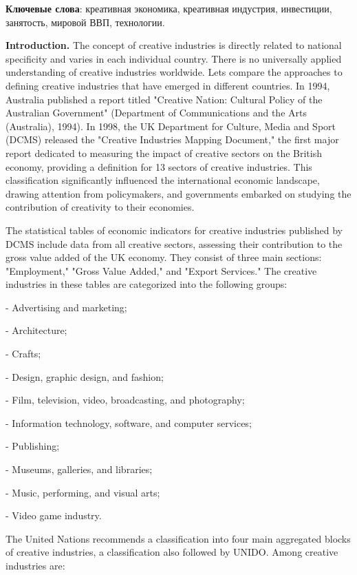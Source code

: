 {\bfseries Ключевые слова}: креативная экономика, креативная индустрия,
инвестиции, занятость, мировой ВВП, технологии.

\begin{multicols}{2}
{\bfseries Introduction.} The concept of creative industries is directly
related to national specificity and varies in each individual country.
There is no universally applied understanding of creative industries
worldwide. Let\textquotesingle s compare the approaches to defining
creative industries that have emerged in different countries. In 1994,
Australia published a report titled "Creative Nation: Cultural Policy of
the Australian Government" (Department of Communications and the Arts
(Australia), 1994). In 1998, the UK Department for Culture, Media and
Sport (DCMS) released the "Creative Industries Mapping Document," the
first major report dedicated to measuring the impact of creative sectors
on the British economy, providing a definition for 13 sectors of
creative industries. This classification significantly influenced the
international economic landscape, drawing attention from policymakers,
and governments embarked on studying the contribution of creativity to
their economies.

The statistical tables of economic indicators for creative industries
published by DCMS include data from all creative sectors, assessing
their contribution to the gross value added of the UK economy. They
consist of three main sections: "Employment," "Gross Value Added," and
"Export Services." The creative industries in these tables are
categorized into the following groups:

- Advertising and marketing;

- Architecture;

- Crafts;

- Design, graphic design, and fashion;

- Film, television, video, broadcasting, and photography;

- Information technology, software, and computer services;

- Publishing;

- Museums, galleries, and libraries;

- Music, performing, and visual arts;

- Video game industry.

The United Nations recommends a classification into four main aggregated
blocks of creative industries, a classification also followed by UNIDO.
Among creative industries are:


\end{multicols}
